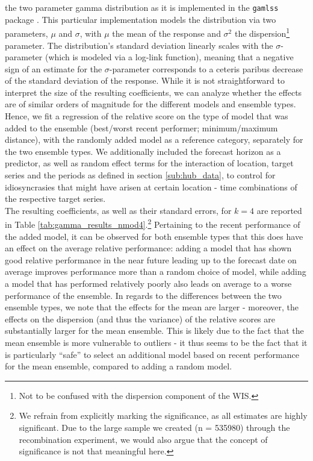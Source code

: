 the two parameter gamma distribution as it is implemented in the \texttt{gamlss} package \citep{rigby_generalized_2005}. This particular implementation models the distribution via two parameters, $\mu$ and $\sigma$, with $\mu$ the mean of the response and $\sigma^2$ the dispersion\footnote{Not to be confused with the dispersion component of the WIS.} parameter. The distribution's standard deviation linearly scales with the $\sigma$-parameter (which is modeled via a log-link function), meaning that a negative sign of an estimate for the $\sigma$-parameter corresponds to a ceteris paribus decrease of the standard deviation of the response. While it is not straightforward to interpret the size of the resulting coefficients, we can analyze whether the effects are of similar orders of magnitude for the different models and ensemble types.\\
Hence, we fit a regression of the relative score on the type of model that was added to the ensemble (best/worst recent performer; minimum/maximum distance), with the randomly added model as a reference category, separately for the two ensemble types. We additionally included the forecast horizon as a predictor, as well as random effect terms for the interaction of location, target series and the periods as defined in section \ref{sub:hub_data}, to control for idiosyncrasies that might have arisen at certain location - time combinations of the respective target series.
\\
The resulting coefficients, as well as their standard errors, for $k = 4$ are reported in Table \ref{tab:gamma_results_nmod4}.\footnote{We refrain from explicitly marking the significance, as all estimates are highly significant. Due to the large sample we created (n = 535980) through the recombination experiment, we would also argue that the concept of significance is not that meaningful here.} Pertaining to the recent performance of the added model, it can be observed for both ensemble types that this does have an effect on the average relative performance: adding a model that has shown good relative performance in the near future leading up to the forecast date on average improves performance more than a random choice of model, while adding a model that has performed relatively poorly also leads on average to a worse performance of the ensemble. In regards to the differences between the two ensemble types, we note that the effects for the mean are larger - moreover, the effects on the dispersion (and thus the variance) of the relative scores are substantially larger for the mean ensemble. This is likely due to the fact that the mean ensemble is more vulnerable to outliers - it thus seems to be the fact that it is particularly ``safe'' to select an additional model based on recent performance for the mean ensemble, compared to adding a random model. \\%
